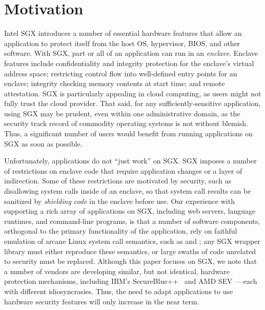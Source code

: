 \section{Motivation}

Intel SGX introduces a number of essential hardware features that allow an application
to protect itself from the host OS, hypervisor, BIOS, and other software.
With SGX, part or all of an application can run in an {\em enclave}.
Enclave features include confidentiality and integrity protection
for the enclave's virtual address space;
restricting control flow into well-defined entry points for an enclave;
integrity checking memory contents at start time;
and remote attestation.
SGX is particularly appealing in cloud computing, as users 
might not fully trust the cloud provider.
That said, for any sufficiently-sensitive application, using SGX may be prudent,
even within one administrative domain,
as the security track record of commodity operating systems is not without blemish.
Thus, a significant number of users would benefit from running applications on SGX as soon as possible.

Unfortunately, applications do not ``just work'' on SGX.
SGX imposes a number of restrictions on enclave code 
that require application changes
or a layer of indirection. %
Some of these restrictions are motivated by security, such as disallowing system calls
inside of an enclave, so that system call results can be sanitized by {\em shielding code} in the enclave before use.
Our experience with supporting a rich array of applications on SGX, including web servers, language runtimes, and
command-line programs,
is that
a number of software components,
orthogonal to the primary functionality of the application,
rely on faithful emulation of arcane Linux system call semantics, such as  and ;
any SGX wrapper library must either reproduce these semantics, or large swaths of code unrelated to security
must be replaced.
Although this paper focuses on SGX, we note that a number of vendors are developing similar, but not identical,
hardware protection mechanisms, including IBM's SecureBlue++~\cite{secureblue++} and AMD SEV~\cite{amd-sme}---each
with different idiosyncrasies.
Thus, the need to adapt applications to use hardware security features
will only increase in the near term.

